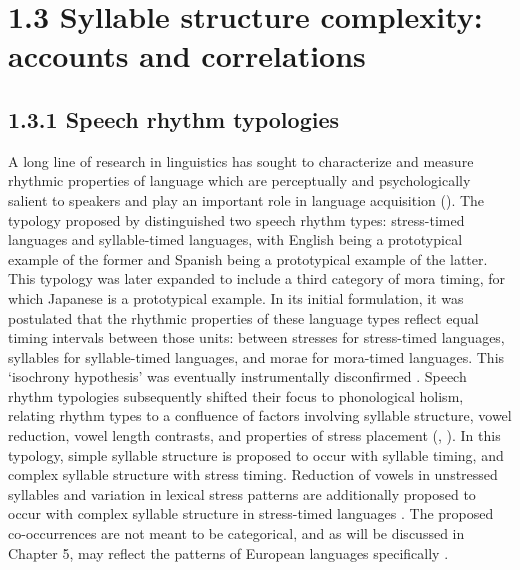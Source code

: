 \section{1.3 Syllable structure complexity: accounts and correlations}
\subsection{1.3.1 Speech rhythm typologies}

  A long line of research in linguistics has sought to characterize and measure rhythmic properties of language which are perceptually and psychologically salient to speakers and play an important role in language acquisition (\citealt{CutlerMehler1993}). The typology proposed by \citet{Pike1945} distinguished two speech rhythm types: stress-timed languages and syllable-timed languages, with English being a prototypical example of the former and Spanish being a prototypical example of the latter. This typology was later expanded to include a third category of mora timing, for which Japanese is a prototypical example. In its initial formulation, it was postulated that the rhythmic properties of these language types reflect equal timing intervals between those units: between stresses for stress-timed languages, syllables for syllable-timed languages, and morae for mora-timed languages. This ‘isochrony hypothesis’ was eventually instrumentally disconfirmed \citep{Roach1982}. Speech rhythm typologies subsequently shifted their  focus to phonological holism, relating rhythm types to a confluence of factors involving syllable structure, vowel reduction, vowel length contrasts, and properties of stress placement (\citealt{Roach1982}, \citealt{Dauer1983}). In this typology, simple syllable structure is proposed to occur with syllable timing, and complex syllable structure with stress timing. Reduction of vowels in unstressed syllables and variation in lexical stress patterns are additionally proposed to occur with complex syllable structure in stress-timed languages \citep{Auer1993}. The proposed co-occurrences are not meant to be categorical, and as will be discussed in Chapter 5, may reflect the patterns of European languages specifically \citep{Schiering2007}.



